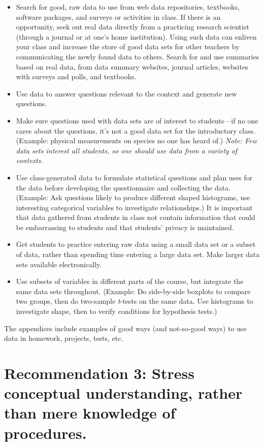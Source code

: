 \documentclass[twoside,openany]{tufte-book}
\begin{document}
\begin{itemize}[leftmargin=1cm,  itemsep=.2em]
\item Search for good, raw data to use from web data repositories, textbooks, software packages, and surveys or activities in class. If there is an opportunity, seek out real data directly from a practicing research scientist (through a journal or at one's home institution). Using such data can enliven your class and increase the store of good data sets for other teachers by communicating the newly found data to others.
Search for and use summaries based on real data, from data summary websites, journal articles, websites with surveys and polls, and textbooks.
\item Use data to answer questions relevant to the context and generate new questions.
\item Make sure questions used with data sets are of interest to students---if no one cares about the questions, it's not a good data set for the introductory class. (Example: physical measurements on species no one has heard of.) \textit{Note:  Few data sets interest all students, so one should use data from a variety of contexts.}
\item Use class-generated data to formulate statistical questions and plan uses for the data before developing the questionnaire and collecting the data. (Example: Ask questions likely to produce different shaped histograms, use interesting categorical variables to investigate relationships.) It is important that data gathered from students in class not contain information that could be embarrassing to students and that students' privacy is maintained.
\item Get students to practice entering raw data using a small data set or a subset of data, rather than spending time entering a large data set. Make larger data sets available electronically.
\item Use subsets of variables in different parts of the course, but integrate the same data sets throughout. (Example: Do side-by-side boxplots to compare two groups, then do two-sample \textit{t}-tests on the same data. Use histograms to investigate shape, then to verify conditions for hypothesis tests.)
\end{itemize}
 
The appendices include examples of good ways (and not-so-good ways) to use data in homework, projects, tests, etc.

\section{\textbf{Recommendation 3: Stress conceptual understanding, rather than mere knowledge of procedures.}}
 
\end{document}
